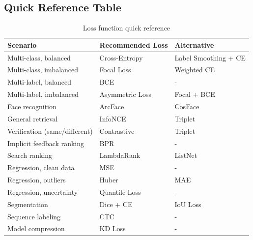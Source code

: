 \subsection{Quick Reference Table}

\begin{table}[H]
\centering
\caption{Loss function quick reference}
\begin{tabularx}{\textwidth}{lXl}
\toprule
\textbf{Scenario} & \textbf{Recommended Loss} & \textbf{Alternative} \\
\midrule
Multi-class, balanced & Cross-Entropy & Label Smoothing + CE \\
Multi-class, imbalanced & Focal Loss & Weighted CE \\
Multi-label, balanced & BCE & - \\
Multi-label, imbalanced & Asymmetric Loss & Focal + BCE \\
Face recognition & ArcFace & CosFace \\
General retrieval & InfoNCE & Triplet \\
Verification (same/different) & Contrastive & Triplet \\
Implicit feedback ranking & BPR & - \\
Search ranking & LambdaRank & ListNet \\
Regression, clean data & MSE & - \\
Regression, outliers & Huber & MAE \\
Regression, uncertainty & Quantile Loss & - \\
Segmentation & Dice + CE & IoU Loss \\
Sequence labeling & CTC & - \\
Model compression & KD Loss & - \\
\bottomrule
\end{tabularx}
\end{table}

